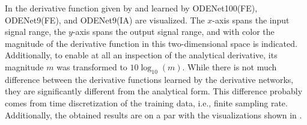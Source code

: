 In  the derivative function given by  and learned by ODENet100(FE), ODENet9(FE), and ODENet9(IA)  are visualized. The $x$-axis spans the input signal range, the $y$-axis spans the output signal range, and with color the magnitude of the derivative function in this two-dimensional space is indicated. Additionally, to enable at all an inspection of the analytical derivative, its magnitude $m$ was transformed to $10 \log_{10}(m)$. While there is not much difference between the derivative functions learned by the derivative networks, they are significantly different from the analytical form. This difference probably comes from time discretization of the training data, i.e., finite sampling rate. Additionally, the obtained results are on a par with the visualizations shown in \cite{Parker2019}.
